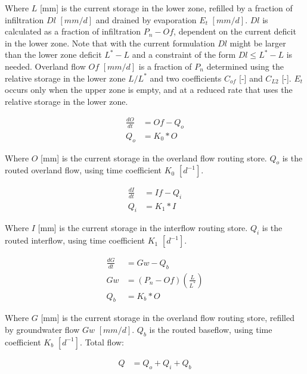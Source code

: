 Where $L$ [mm] is the current storage in the lower zone, refilled by a fraction of infiltration $Dl$ $[mm/d]$ and drained by evaporation $E_t$ $[mm/d]$. $Dl$ is calculated as a fraction of infiltration $P_n -Of$, dependent on the current deficit in the lower zone. 
Note that with the current formulation $Dl$ might be larger than the lower zone deficit $L^*-L$ and a constraint of the form $Dl \leq L^*-L$ is needed.
 Overland flow $Of$ $[mm/d]$ is a fraction of $P_n$ determined using the relative storage in the lower zone $L/L^*$ and two coefficients $C_{of}$ [-] and $C_{L2}$ [-]. 
$E_t$ occurs only when the upper zone is empty, and at a reduced rate that uses the relative storage in the lower zone.

\begin{align}
	\frac{dO}{dt} &= Of - Q_o\\
	Q_o &= K_0 * O 
\end{align}

Where $O$ [mm] is the current storage in the overland flow routing store.
$Q_o$ is the routed overland flow, using time coefficient $K_0$ $[d^{-1}]$.

\begin{align}
	\frac{dI}{dt} &= If - Q_i\\
	Q_i &= K_1 * I 
\end{align}

Where $I$ [mm] is the current storage in the interflow routing store.
$Q_i$ is the routed interflow, using time coefficient $K_1$ $[d^{-1}]$.

\begin{align}
	\frac{dG}{dt} &= Gw - Q_b\\
	Gw &= (P_n-Of)\left(\frac{L}{L^*}\right)\\
	Q_b &= K_b * O 
\end{align}

Where $G$ [mm] is the current storage in the overland flow routing store, refilled by groundwater flow $Gw$ $[mm/d]$.
$Q_b$ is the routed baseflow, using time coefficient $K_b$ $[d^{-1}]$. Total flow:

\begin{align}
	Q &= Q_o+Q_i+Q_b
\end{align}


